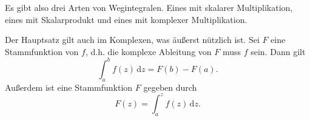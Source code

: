\documentclass[a4paper,10pt,fleqn,twocolumn,twoside]{article}
\begin{document}
Es gibt also drei Arten von Wegintegralen. Eines mit skalarer
Multiplikation, eines mit Skalarprodukt und eines mit komplexer
Multiplikation.

Der Hauptsatz gilt auch im Komplexen, was äußerst
nützlich ist. Sei $F$ eine Stammfunktion von $f$, d.h. die
komplexe Ableitung von $F$ muss $f$ sein. Dann gilt
\[\int_a^b f(z)\,\mathrm dz = F(b)-F(a).\]
Außerdem ist eine Stammfunktion $F$ gegeben durch
\[F(z) = \int_a^z f(z)\,\mathrm dz.\]
\end{document}
